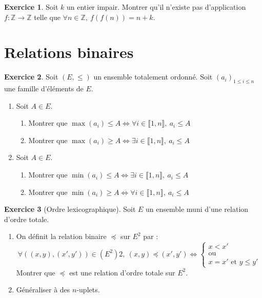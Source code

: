 \documentclass[french]{book}
\newcommand{\Z}{\mathbb{Z}}
\theoremstyle{definition}
\newtheorem{ex}{Exercice}[chapter]
\theoremstyle{theorem}
\theoremstyle{remark}
\begin{document}
\begin{ex}
	Soit $k$ un entier impair. Montrer qu'il n'existe pas d'application $f:\Z\to\Z$ telle que $\forall n\in\Z,\ f(f(n))=n+k$.
\end{ex}

\section{Relations binaires}

\begin{ex}
	Soit $(E,\leqslant)$ un ensemble totalement ordonné. Soit $(a_i)_{1\leqslant i\leqslant n}$ une famille d'éléments de $E$.
	\begin{enumerate}
		\item Soit $A\in E$. \begin{enumerate}[label=\alph*.]
			\item Montrer que $\max(a_i)\leqslant A\iff\forall i\in\llbracket1,n\rrbracket,\ a_i\leqslant A$
			\item Montrer que $\max(a_i)\geqslant A\iff\exists i\in\llbracket1,n\rrbracket,\ a_i\leqslant A$
		\end{enumerate}
		\item Soit $A\in E$. \begin{enumerate}[label=\alph*.]
			\item Montrer que $\min(a_i)\leqslant A\iff\exists i\in\llbracket1,n\rrbracket,\ a_i\leqslant A$
			\item Montrer que $\min(a_i)\geqslant A\iff\forall i\in\llbracket1,n\rrbracket,\ a_i\leqslant A$
		\end{enumerate}
	\end{enumerate}
\end{ex}

\begin{ex}[Ordre lexicographique]
	Soit $E$ un ensemble muni d'une relation d'ordre totale.
	\begin{enumerate}
		\item On définit la relation binaire $\preceq$ sur $E^2$ par : $$\forall \left((x,y),(x',y')\right)\in(E^2)2,\ (x,y)\preceq(x',y')\iff\begin{cases}
			x<x' \\
			\text{ou}\\
			x=x'\text{ et }y\leqslant y'
		\end{cases}$$ Montrer que $\preceq$ est une relation d'ordre totale sur $E^2$.
		\item Généraliser à des $n$-uplets.
	\end{enumerate}
\end{ex}
\end{document}
